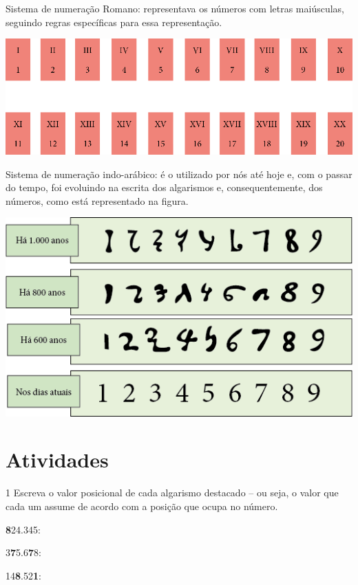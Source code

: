 {Sistema de numeração Romano: representava os números com letras
maiúsculas, seguindo regras específicas para essa representação.\bigskip

\includegraphics[width=\textwidth]{media/image4.png}\bigskip

Sistema de numeração indo-arábico: é o utilizado por nós
até hoje e, com o passar do tempo, foi evoluindo na escrita dos algarismos e, consequentemente, dos números, como está representado na figura.\smallskip

\includegraphics[width=.8\textwidth]{media/image5.png}
}

\section{Atividades}

\num{1} Escreva o valor posicional de cada algarismo
destacado -- ou seja, o valor que cada um assume de acordo com a posição
que ocupa no número.

\begin{escolha}
\item \textbf{8}24.345: 

\item 3\textbf{7}5.6\textbf{7}8: 

\item 14\textbf{8}.52\textbf{1}:
\end{escolha}

